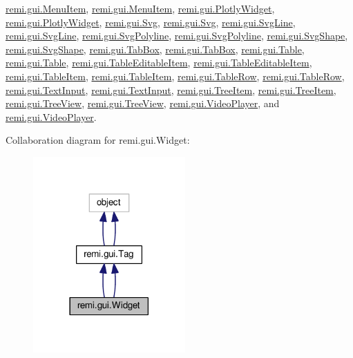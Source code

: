 \hyperlink{classremi_1_1gui_1_1MenuItem}{remi.\+gui.\+Menu\+Item}, \hyperlink{classremi_1_1gui_1_1MenuItem}{remi.\+gui.\+Menu\+Item}, \hyperlink{classremi_1_1gui_1_1PlotlyWidget}{remi.\+gui.\+Plotly\+Widget}, \hyperlink{classremi_1_1gui_1_1PlotlyWidget}{remi.\+gui.\+Plotly\+Widget}, \hyperlink{classremi_1_1gui_1_1Svg}{remi.\+gui.\+Svg}, \hyperlink{classremi_1_1gui_1_1Svg}{remi.\+gui.\+Svg}, \hyperlink{classremi_1_1gui_1_1SvgLine}{remi.\+gui.\+Svg\+Line}, \hyperlink{classremi_1_1gui_1_1SvgLine}{remi.\+gui.\+Svg\+Line}, \hyperlink{classremi_1_1gui_1_1SvgPolyline}{remi.\+gui.\+Svg\+Polyline}, \hyperlink{classremi_1_1gui_1_1SvgPolyline}{remi.\+gui.\+Svg\+Polyline}, \hyperlink{classremi_1_1gui_1_1SvgShape}{remi.\+gui.\+Svg\+Shape}, \hyperlink{classremi_1_1gui_1_1SvgShape}{remi.\+gui.\+Svg\+Shape}, \hyperlink{classremi_1_1gui_1_1TabBox}{remi.\+gui.\+Tab\+Box}, \hyperlink{classremi_1_1gui_1_1TabBox}{remi.\+gui.\+Tab\+Box}, \hyperlink{classremi_1_1gui_1_1Table}{remi.\+gui.\+Table}, \hyperlink{classremi_1_1gui_1_1Table}{remi.\+gui.\+Table}, \hyperlink{classremi_1_1gui_1_1TableEditableItem}{remi.\+gui.\+Table\+Editable\+Item}, \hyperlink{classremi_1_1gui_1_1TableEditableItem}{remi.\+gui.\+Table\+Editable\+Item}, \hyperlink{classremi_1_1gui_1_1TableItem}{remi.\+gui.\+Table\+Item}, \hyperlink{classremi_1_1gui_1_1TableItem}{remi.\+gui.\+Table\+Item}, \hyperlink{classremi_1_1gui_1_1TableRow}{remi.\+gui.\+Table\+Row}, \hyperlink{classremi_1_1gui_1_1TableRow}{remi.\+gui.\+Table\+Row}, \hyperlink{classremi_1_1gui_1_1TextInput}{remi.\+gui.\+Text\+Input}, \hyperlink{classremi_1_1gui_1_1TextInput}{remi.\+gui.\+Text\+Input}, \hyperlink{classremi_1_1gui_1_1TreeItem}{remi.\+gui.\+Tree\+Item}, \hyperlink{classremi_1_1gui_1_1TreeItem}{remi.\+gui.\+Tree\+Item}, \hyperlink{classremi_1_1gui_1_1TreeView}{remi.\+gui.\+Tree\+View}, \hyperlink{classremi_1_1gui_1_1TreeView}{remi.\+gui.\+Tree\+View}, \hyperlink{classremi_1_1gui_1_1VideoPlayer}{remi.\+gui.\+Video\+Player}, and \hyperlink{classremi_1_1gui_1_1VideoPlayer}{remi.\+gui.\+Video\+Player}.



Collaboration diagram for remi.\+gui.\+Widget\+:
\nopagebreak
\begin{figure}[H]
\begin{center}
\leavevmode
\includegraphics[width=165pt]{dd/d9d/classremi_1_1gui_1_1Widget__coll__graph}
\end{center}
\end{figure}
